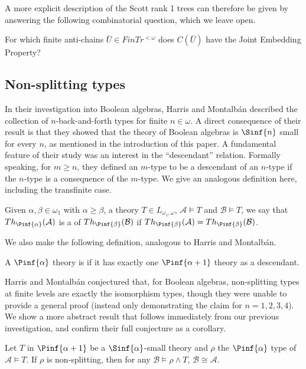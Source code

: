 \documentclass[10pt,a4paper]{amsart}
\renewcommand{\-}{\text{-}}
\begin{document}
A more explicit description of the Scott rank 1 trees can therefore be given by answering the following combinatorial question, which we leave open.
\begin{question}
For which finite anti-chains $\bar{U}\in FinTr^{<\omega}$ does $C(\bar{U})$ have the Joint Embedding Property?
\end{question}

\subsection{Non-splitting types}
In their investigation into Boolean algebras, Harris and Montalbán \cite{HM} described the collection of $n$-back-and-forth types for finite $n\in\omega$.
A direct consequence of their result is that they showed that the theory of Boolean algebras is $\Sinf{n}$ small for every $n$, as mentioned in the introduction of this paper.
A fundamental feature of their study was an interest in the ``descendant'' relation.
Formally speaking, for $m\geq n$, they defined an $m$-type to be a descendant of an $n$-type if the $n$-type is a consequence of the $m$-type.
We give an analogous definition here, including the transfinite case.
\begin{definition}
Given $\alpha,\beta\in\omega_1$ with $\alpha\geq\beta$, a theory $T\in L_{\omega_1,\omega}$, $\mathcal{A}\models T$ and  $\mathcal{B}\models T$, we say that $Th_{\Pinf{\alpha}}(\mathcal{A})$ is a  of $Th_{\Pinf{\beta}}(\mathcal{B})$ if $Th_{\Pinf{\beta}}(\mathcal{A}) = Th_{\Pinf{\beta}}(\mathcal{B})$.
\end{definition}

We also make the following definition, analogous to Harris and Montalbán.
\begin{definition}
A $\Pinf{\alpha}$ theory is  if it has exactly one $\Pinf{\alpha+1}$ theory as a descendant.
\end{definition}

Harris and Montalbán conjectured that, for Boolean algebras, non-splitting types at finite levels are exactly the isomorphism types, though they were unable to provide a general proof (instead only demonstrating the claim for $n=1,2,3,4$).
We show a more abstract result that follows immediately from our previous investigation, and confirm their full conjecture as a corollary.

\begin{proposition}\label{prop:nonsplittingTypes}
  Let $T$ in $\Pinf{\alpha+1}$ be a $\Sinf{\alpha}$-small theory and $\rho$ the $\Pinf{\alpha}$ type of $\mathcal{A}\models T$.
If $\rho$ is non-splitting, then for any $\mathcal{B}\models\rho\land T$, $\mathcal{B}\cong\mathcal{A}$.
\end{proposition}
\end{document}
